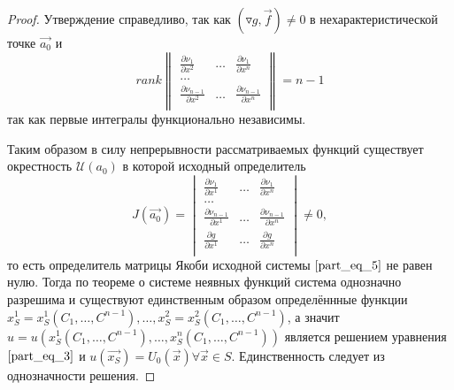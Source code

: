 \begin{proof}
    Утверждение справедливо, так как $ \left( \triangledown g, \overrightarrow{f} \right) \neq 0$ в нехарактеристической точке $\overrightarrow{a_0}$ и
    \begin{equation*}
        rank
        \begin{Vmatrix}
            \frac{\partial \nu_1}{\partial x^2} & \dots & \frac{\partial \nu_1}{\partial x^n}             \\
            \dots                                                                                         \\
            \frac{\partial \nu_{n - 1}}{\partial x^2} & \dots & \frac{\partial \nu_{n - 1}}{\partial x^n} \\
        \end{Vmatrix} = n - 1
    \end{equation*}
    так как первые интегралы функционально независимы.

    Таким образом в силу непрерывности рассматриваемых функций существует окрестность $\mathcal{U} \left( a_0 \right)$ в которой исходный определитель
    \begin{equation*}
        J \left( \overrightarrow{a_0} \right) =
        \begin{vmatrix}
            \frac{\partial \nu_1}{\partial x^1} & \dots & \frac{\partial \nu_1}{\partial x^n}             \\
            \dots                                                                                         \\
            \frac{\partial \nu_{n - 1}}{\partial x^1} & \dots & \frac{\partial \nu_{n - 1}}{\partial x^n} \\
            \frac{\partial g}{\partial x^1} & \dots & \frac{\partial g}{\partial x^n}                     \\
        \end{vmatrix} \neq 0,
    \end{equation*}
    то есть определитель матрицы Якоби исходной системы $\eqref{part_eq_5}$ не равен нулю. Тогда по теореме о системе неявных функций система однозначно разрешима и существуют единственным образом определённные функции $x^1_S = x^1_S \left( C_1, \dots, C^{n - 1} \right), \dots, x^2_S = x^2_S \left( C_1, \dots, C^{n - 1} \right)$, а значит $u = u \left( x^1_S \left( C_1, \dots, C^{n - 1} \right), \dots, x^n_S \left( C_1, \dots, C^{n - 1} \right) \right)$ является решением уравнения $\eqref{part_eq_3}$ и $u \left( \overrightarrow{x_S} \right) = U_0 \left( \overrightarrow{x} \right) \forall \overrightarrow{x} \in S$. Единственность следует из однозначности решения.

\end{proof}

